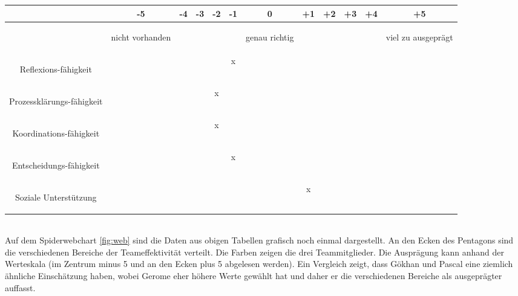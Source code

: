 \begin{tabular}{C{\fabstand}|C{\abstand}|C{\abstand}|C{\abstand}|C{\abstand}|C{\abstand}|C{\abstand}|C{\abstand}|C{\abstand}|C{\abstand}|C{\abstand}|C{\abstand}|}
\hline
& -5 & -4 & -3 & -2 & -1 & 0 & +1 & +2 & +3 & +4 & +5\\
\hline
&\begin{tiny}nicht vorhanden \end{tiny}& & & & & \begin{tiny}genau richtig \end{tiny}& & & & & \begin{tiny}viel zu ausgeprägt\end{tiny}\\
\hline
\begin{tiny} Reflexions-fähigkeit \end{tiny} & & & & & x & & & & & & \\
\hline
\begin{tiny} Prozessklärungs-fähigkeit \end{tiny}& & & & x & & & & & & & \\
\hline
\begin{tiny} Koordinations-fähigkeit \end{tiny}& & & & x & & & & & & & \\
\hline
\begin{tiny} Entscheidungs-fähigkeit \end{tiny}& & & & & x & & & & & & \\
\hline
\begin{tiny} Soziale Unterstützung \end{tiny}& & & & & & & x & & & & \\
\hline
\end{tabular}\\

Auf dem Spiderwebchart \ref{fig:web} sind die Daten aus obigen Tabellen grafisch noch einmal dargestellt. An den Ecken des Pentagons sind die verschiedenen Bereiche der Teameffektivität \cite{Simon1} verteilt. Die Farben zeigen die drei Teammitglieder. Die Ausprägung kann anhand der Werteskala (im Zentrum minus 5 und an den Ecken plus 5 abgelesen werden).
Ein Vergleich zeigt, dass Gökhan und Pascal eine ziemlich ähnliche Einschätzung haben, wobei Gerome eher höhere Werte gewählt hat und daher er die verschiedenen Bereiche als ausgeprägter auffasst.

